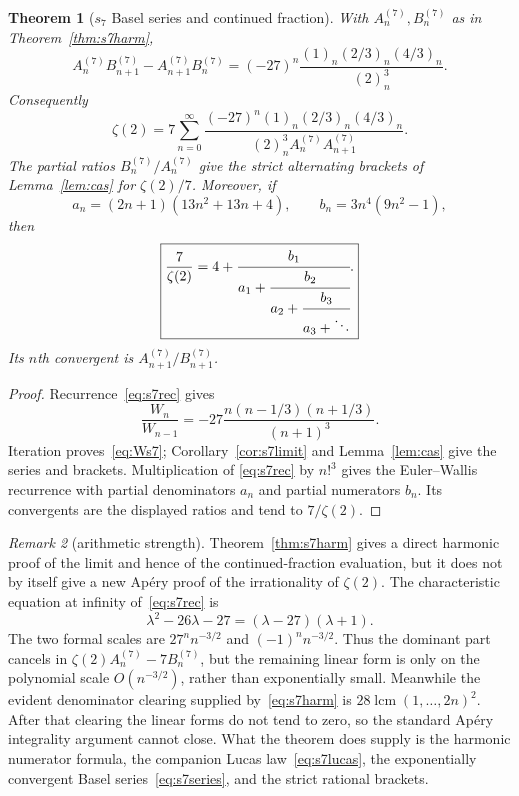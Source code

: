 \documentclass[11pt,reqno]{amsart}
\newtheorem{theorem}{Theorem}[section]
\theoremstyle{definition}
\theoremstyle{remark}
\newtheorem{remark}[theorem]{Remark}
\begin{document}
\begin{theorem}[$s_7$ Basel series and continued fraction]\label{thm:s7cf}
With $A_n^{(7)},B_n^{(7)}$ as in Theorem~\ref{thm:s7harm},
\begin{equation}\label{eq:Ws7}
 A_n^{(7)}B_{n+1}^{(7)}-A_{n+1}^{(7)}B_n^{(7)}
 =(-27)^n\frac{(1)_n(2/3)_n(4/3)_n}{(2)_n^3}.
\end{equation}
Consequently
\begin{equation}\label{eq:s7series}
 \boxed{\displaystyle
 \zeta(2)=7\sum_{n=0}^{\infty}
 \frac{(-27)^n(1)_n(2/3)_n(4/3)_n}
 {(2)_n^3A_n^{(7)}A_{n+1}^{(7)}}.}
\end{equation}
The partial ratios $B_n^{(7)}/A_n^{(7)}$ give the strict alternating brackets
of Lemma~\ref{lem:cas} for $\zeta(2)/7$.  Moreover, if
\[
 a_n=(2n+1)(13n^2+13n+4),\qquad
 b_n=3n^4(9n^2-1),
\]
then
\begin{equation}\label{eq:s7cf}
 \boxed{\displaystyle
 \frac7{\zeta(2)}
 =4+\cfrac{b_1}{a_1+\cfrac{b_2}{a_2+
              \cfrac{b_3}{a_3+\ddots}}}.}
\end{equation}
Its $n$th convergent is $A_{n+1}^{(7)}/B_{n+1}^{(7)}$.
\end{theorem}

\begin{proof}
Recurrence~\eqref{eq:s7rec} gives
\[
 \frac{W_n}{W_{n-1}}
 =-27\frac{n(n-1/3)(n+1/3)}{(n+1)^3}.
\]
Iteration proves~\eqref{eq:Ws7}; Corollary~\ref{cor:s7limit} and
Lemma~\ref{lem:cas} give the series and brackets.  Multiplication of
\eqref{eq:s7rec} by $n!^3$ gives the Euler--Wallis recurrence with partial
denominators $a_n$ and partial numerators $b_n$.  Its convergents are the
displayed ratios and tend to $7/\zeta(2)$.
\end{proof}

\begin{remark}[arithmetic strength]\label{rem:s7irr}
Theorem~\ref{thm:s7harm} gives a direct harmonic proof of the limit and hence
of the continued-fraction evaluation, but it does not by itself give a new
Ap\'ery proof of the irrationality of $\zeta(2)$.  The characteristic equation
at infinity of~\eqref{eq:s7rec} is
\[
 \lambda^2-26\lambda-27=(\lambda-27)(\lambda+1).
\]
The two formal scales are $27^nn^{-3/2}$ and $(-1)^nn^{-3/2}$.  Thus the
dominant part cancels in
$\zeta(2)A_n^{(7)}-7B_n^{(7)}$, but the remaining linear form is only on the
polynomial scale $O(n^{-3/2})$, rather than exponentially small.  Meanwhile
the evident denominator clearing supplied by~\eqref{eq:s7harm} is
$28\operatorname{lcm}(1,\ldots,2n)^2$.  After that clearing the linear forms
do not tend to zero, so the standard Ap\'ery integrality argument cannot
close.  What the theorem does supply is the harmonic numerator formula, the
companion Lucas law~\eqref{eq:s7lucas}, the exponentially convergent Basel
series~\eqref{eq:s7series}, and the strict rational brackets.
\end{remark}
\end{document}
